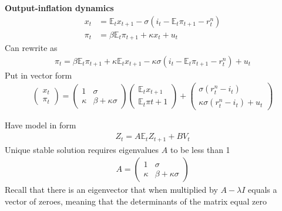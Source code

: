 \documentclass{beamer}
\begin{document}
\begin{frame}
  \textbf{Output-inflation dynamics}
\begin{align}
  x_t &=\mathbb{E}_tx_{t+1} - \sigma(i_t-\mathbb{E}_t\pi_{t+1} - r_t^n)\\
  \pi_t &= \beta \mathbb{E}_t \pi_{t+1} + \kappa x_t + u_t
\end{align}
\medskip
Can rewrite as  
\begin{align}
  \pi_t = \beta \mathbb{E}_t \pi_{t+1} + \kappa \mathbb{E}_t x_{t+1} - \kappa\sigma(i_t - \mathbb{E}_t \pi_{t+1} - r_t^n) + u_t
\end{align}
 Put in vector form
\begin{align}
  \begin{pmatrix} x_t \\ \pi_t \end{pmatrix} = \begin{pmatrix} 1 & \sigma \\ \kappa & \beta +\kappa\sigma \end{pmatrix}
  \begin{pmatrix} \mathbb{E}_tx_{t+1} \\ \mathbb{E}_t \pi{t+1} \end{pmatrix} + 
  \begin{pmatrix} \sigma (r_t^n-i_t) \\ \kappa\sigma (r_t^n-i_t) + u_t \end{pmatrix}
\end{align}  
\end{frame}

\begin{frame}
 Have model in form
 \begin{align}
  Z_t=A\mathbb{E}_tZ_{t+1}+BV_t 
 \end{align}
 \medskip
 Unique stable solution requires eigenvalues $A$ to be less than 1
\begin{align} 
 A=\begin{pmatrix} 1 & \sigma \\ \kappa & \beta +\kappa\sigma \end{pmatrix} 
 \end{align}
 Recall that there is an eigenvector that when multiplied by $A-\lambda I$ equals a vector of zeroes, meaning that the determinants of the matrix equal zero
\end{frame}
\end{document}
